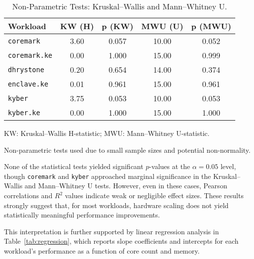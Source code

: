 \begin{table}[htbp]
\begin{subtable}[t]{\textwidth}
\centering
\caption{Non-Parametric Tests: Kruskal–Wallis and Mann–Whitney U.}
\vspace{0.5em}
\begin{tabular}{@{}l
                S[table-format=2.2] S[table-format=1.3]
                S[table-format=2.2] S[table-format=1.3]@{}}
\toprule
\textbf{Workload} 
& \textbf{KW (H)} & \textbf{p (KW)} 
& \textbf{MWU (U)} & \textbf{p (MWU)} \\
\midrule
\texttt{coremark}      & 3.60 & 0.057 & 10.00 & 0.052 \\
\texttt{coremark.ke}   & 0.00 & 1.000 & 15.00 & 0.999 \\
\texttt{dhrystone}     & 0.20 & 0.654 & 14.00 & 0.374 \\
\texttt{enclave.ke}    & 0.01 & 0.961 & 15.00 & 0.961 \\
\texttt{kyber}         & 3.75 & 0.053 & 10.00 & 0.053 \\
\texttt{kyber.ke}      & 0.00 & 1.000 & 15.00 & 1.000 \\
\bottomrule
\end{tabular}
\begin{tablenotes}
\footnotesize
\item KW: Kruskal–Wallis H-statistic; MWU: Mann–Whitney U-statistic.
\item Non-parametric tests used due to small sample sizes and potential non-normality.
\end{tablenotes}
\end{subtable}
\end{table}

None of the statistical tests yielded significant $p$-values at the $\alpha = 0.05$ level, though \texttt{coremark} and \texttt{kyber} approached marginal significance in the Kruskal–Wallis and Mann–Whitney U tests. However, even in these cases, Pearson correlations and $R^2$ values indicate weak or negligible effect sizes. These results strongly suggest that, for most workloads, hardware scaling does not yield statistically meaningful performance improvements.

This interpretation is further supported by linear regression analysis in Table~\ref{tab:regression}, which reports slope coefficients and intercepts for each workload's performance as a function of core count and memory.

